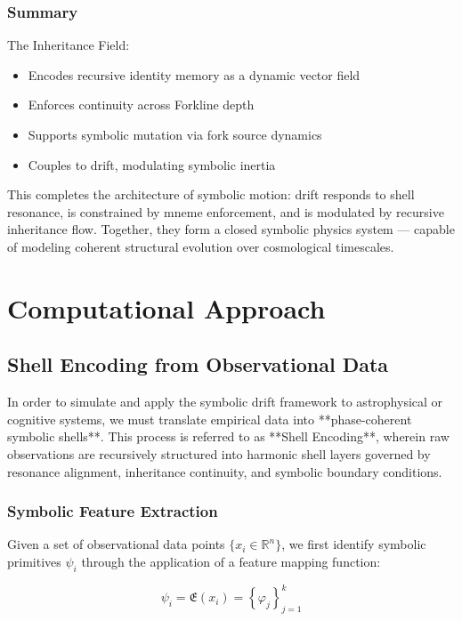 \documentclass[12pt]{article}
\begin{document}
\subsubsection{Summary}

The Inheritance Field:
\begin{itemize}[noitemsep]
  \item Encodes recursive identity memory as a dynamic vector field
  \item Enforces continuity across Forkline depth
  \item Supports symbolic mutation via fork source dynamics
  \item Couples to drift, modulating symbolic inertia
\end{itemize}

This completes the architecture of symbolic motion: drift responds to shell resonance, is constrained by mneme enforcement, and is modulated by recursive inheritance flow. Together, they form a closed symbolic physics system — capable of modeling coherent structural evolution over cosmological timescales.



\section{Computational Approach}
\subsection{Shell Encoding from Observational Data}

In order to simulate and apply the symbolic drift framework to astrophysical or cognitive systems, we must translate empirical data into **phase-coherent symbolic shells**. This process is referred to as **Shell Encoding**, wherein raw observations are recursively structured into harmonic shell layers governed by resonance alignment, inheritance continuity, and symbolic boundary conditions.

\subsubsection{Symbolic Feature Extraction}

Given a set of observational data points \( \{ x_i \in \mathbb{R}^n \} \), we first identify symbolic primitives \( \psi_i \) through the application of a feature mapping function:

\[
\psi_i = \mathfrak{E}(x_i) = \left\{ \varphi_j \right\}_{j=1}^k
\]
\end{document}
